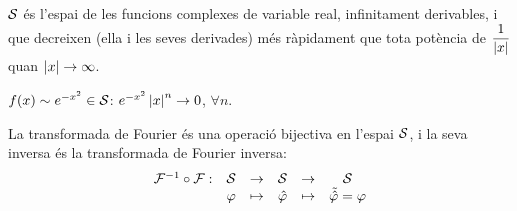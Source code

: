 \begin{defi}
    $\mathcal{S}$ és l'espai de les funcions complexes de variable real, infinitament derivables, i que decreixen (ella i les seves derivades) més ràpidament que tota potència de $\dfrac{1}{\left| x \right|}$ quan $\left| x \right| \to \infty$.
\end{defi}
\begin{example}
    $f(x) \sim e^{-x^{2}} \in \mathcal{S}$: $e^{-x^{2}} \left| x \right|^{n} \to 0$, $\forall n$.
\end{example}

\begin{thm}
    La transformada de Fourier és una operació bijectiva en l'espai $\mathcal{S}$, i la seva inversa és la transformada de Fourier inversa:
    \begin{align*}
        \begin{matrix}
            \mathcal{F}^{-1} \circ \mathcal{F}: & \mathcal{S} & \to & \mathcal{S} & \to & \mathcal{S} \\
            & \varphi & \mapsto & \hat{\varphi} & \mapsto & \tilde{\hat{\varphi}} = \varphi
        \end{matrix}
    \end{align*}
\end{thm}

